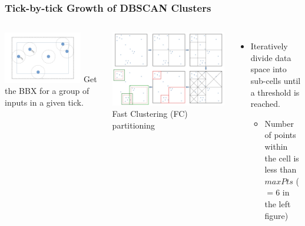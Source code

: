 \begin{frame}
    \frametitle{Tick-by-tick Growth of DBSCAN Clusters}
    \begin{columns}
                \begin{columns}
                        \centering             \includegraphics[width=0.8\textwidth]{resource/figures/boundingbox.png}
                        \tiny Get the BBX for a group of inputs in a given tick.
                \end{columns}
            \centering
            \includegraphics[width=\textwidth]{resource/figures/rt-dbscan.png}
        \small Fast Clustering (FC) partitioning
        \begin{itemize}
            \item \tiny Iteratively divide data space into sub-cells until a threshold is reached.
            \begin{itemize}
                \item \tiny Number of points within the cell is less than $maxPts$ ($=6$ in the left figure)

\end{itemize}
\end{itemize}
\end{columns}
\end{frame}
